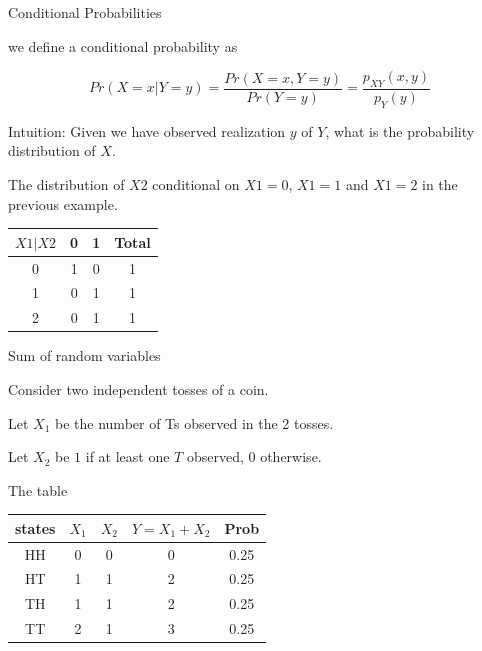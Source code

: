 \documentclass{beamer}\usepackage[]{graphicx}\usepackage[]{color}
\begin{document}
\begin{frame}[fragile]{Conditional Probabilities \;\;}

we define a conditional probability as

$$ Pr(X=x | Y=y) = \frac{Pr(X=x, Y=y)}{Pr(Y=y)} = \frac{p_{XY}(x,y)}{p_{Y}(y)} $$

Intuition: Given we have observed realization $y$ of $Y$, what is the probability distribution of $X$.

The distribution of $X2$ conditional on $X1=0$, $X1=1$ and $X1=2$ in the previous example. \pause \newline

\begin{tabular}{|c|c|c|c|}
\hline
$X1|X2$ & 0 & 1 & Total\\ \hline
0 & 1 & 0 & 1\\ \hline
1 & 0 & 1 & 1 \\ \hline
2 & 0 & 1 & 1  \\ \hline
\end{tabular}

\end{frame}

\begin{frame}[fragile]{Sum of random variables \;\;}

Consider two independent tosses of a coin. \newline

Let $X_1$ be the number of Ts observed in the 2 tosses. \newline

Let $X_2$ be $1$ if at least one $T$ observed, $0$ otherwise. \pause \newline

The table

\begin{tabular}{|c|c|c|c|c|}
\hline
states & $X_1$ & $X_2$ & $Y=X_1+X_2$ & Prob \\ \hline
HH & 0 & 0 & 0 & 0.25 \\ \hline
HT & 1 & 1 & 2 & 0.25 \\ \hline
TH & 1 & 1 & 2 & 0.25 \\ \hline
TT & 2 & 1 & 3 & 0.25 \\ \hline
\end{tabular}

\end{frame}
\end{document}
